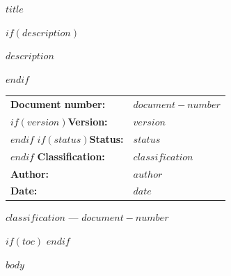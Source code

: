 \documentclass[11pt,a4paper]{article}
\begin{document}
\begin{titlepage}
\thispagestyle{empty}
\begin{center}
\vspace*{1.5cm}
{\sffamily\color{lgblue}\Huge\bfseries $title$\par}
\vspace{0.4cm}
$if(description)$
{\sffamily\color{notegrey}\large $description$\par}
\vspace{0.6cm}
$endif$

\vspace{1cm}
\begin{tcolorbox}[colback=white,colframe=lgblue,boxrule=0.8pt,arc=1mm,width=0.72\textwidth,left=14pt,right=14pt,top=10pt,bottom=10pt]
\sffamily
\begin{tabular}{@{}ll@{}}
\textbf{Document number:} & $document-number$ \\[2pt]
$if(version)$\textbf{Version:} & $version$ \\[2pt]$endif$
$if(status)$\textbf{Status:} & $status$ \\[2pt]$endif$
\textbf{Classification:} & $classification$ \\[2pt]
\textbf{Author:} & $author$ \\[2pt]
\textbf{Date:} & $date$ \\
\end{tabular}
\end{tcolorbox}
\end{center}
\vfill
{\centering\sffamily\small\color{notegrey} $classification$ --- $document-number$\par}
\end{titlepage}

\newpage
$if(toc)$
{\hypersetup{linkcolor=lgblue}
\tableofcontents}
\newpage
$endif$

$body$

\FloatBarrier
\end{document}
